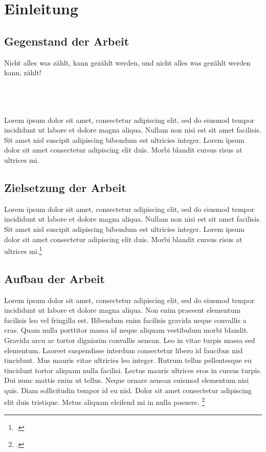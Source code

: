 \section{Einleitung}\label{einleitung}\thispagestyle{FooBar}
\subsection{Gegenstand der Arbeit}
\begin{itshape}\au Nicht alles was zählt, kann gezählt werden, und nicht alles was gezählt werden
kann, zählt!\ao\end{itshape}  
\\\\
\\
Lorem ipsum dolor sit amet, consectetur adipiscing elit, sed do eiusmod tempor incididunt ut labore et dolore magna aliqua. Nullam non nisi est sit amet facilisis. Sit amet nisl suscipit adipiscing bibendum est ultricies integer. Lorem ipsum dolor sit amet consectetur adipiscing elit duis. Morbi blandit cursus risus at ultrices mi. \textcite[20]{geer}
\subsection{Zielsetzung der Arbeit}
Lorem ipsum dolor sit amet, consectetur adipiscing elit, sed do eiusmod tempor incididunt ut labore et dolore magna aliqua. Nullam non nisi est sit amet facilisis. Sit amet nisl suscipit adipiscing bibendum est ultricies integer. Lorem ipsum dolor sit amet consectetur adipiscing elit duis. Morbi blandit cursus risus at ultrices mi.\footcite[]{gaonkar}
\subsection{Aufbau der Arbeit}
Lorem ipsum dolor sit amet, consectetur adipiscing elit, sed do eiusmod tempor incididunt ut labore et dolore magna aliqua. Non enim praesent elementum facilisis leo vel fringilla est. Bibendum enim facilisis gravida neque convallis a cras. Quam nulla porttitor massa id neque aliquam vestibulum morbi blandit. Gravida arcu ac tortor dignissim convallis aenean. Leo in vitae turpis massa sed elementum. Laoreet suspendisse interdum consectetur libero id faucibus nisl tincidunt. Mus mauris vitae ultricies leo integer. Rutrum tellus pellentesque eu tincidunt tortor aliquam nulla facilisi. Lectus mauris ultrices eros in cursus turpis. Dui nunc mattis enim ut tellus. Neque ornare aenean euismod elementum nisi quis. Diam sollicitudin tempor id eu nisl. Dolor sit amet consectetur adipiscing elit duis tristique. Metus aliquam eleifend mi in nulla posuere.
\footcite[10]{jaffe}